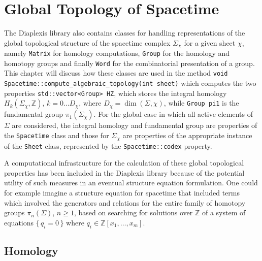 \documentclass[12pt,letterpaper]{report}
\begin{document}
\chapter{Global Topology of Spacetime}

The Diaplexis library also contains classes for handling representations of the global topological 
structure of the spacetime complex $\Sigma_\chi$ for a given sheet $\chi$, namely \texttt{Matrix} for 
homology computations, \texttt{Group} for the homology and homotopy groups and finally \texttt{Word} 
for the combinatorial presentation of a group. This chapter will discuss how these classes are used 
in the method\newline
\texttt{void Spacetime::compute\_algebraic\_topology(int sheet)}  
\newline
which computes the two properties \texttt{std::vector<Group> HZ}, which stores the integral homology 
$H_k(\Sigma_\chi,\mathbb{Z})$, $k=0\dots D_\chi$, where $D_\chi = \dim(\Sigma,\chi)$, while \texttt{Group pi1} 
is the fundamental group $\pi_1(\Sigma_\chi)$. For the global case in which all active elements of 
$\Sigma$ are considered, the integral homology and fundamental group are properties of the \texttt{Spacetime} 
class and those for $\Sigma_\chi$ are properties of the appropriate instance of the \texttt{Sheet} class, 
represented by the \texttt{Spacetime::codex} property. 

A computational infrastructure for the calculation of these global topological properties has been 
included in the Diaplexis library because of the potential utility of such measures in an eventual 
structure equation formulation. One could for example imagine a structure equation for spacetime that 
included terms which involved the generators and relations for the entire family of homotopy groups 
$\pi_n(\Sigma)$, $n\ge 1$, based on searching for solutions over $\mathbb{Z}$ of a system of equations 
$\{\, q_i = 0\,\}$ where $q_i \in \mathbb{Z}[x_1,\dots,x_m]$.  

\section{Homology}
\end{document}

